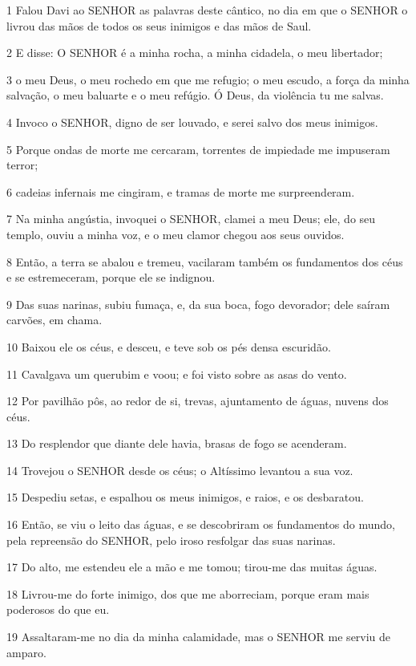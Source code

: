 \par 1 Falou Davi ao SENHOR as palavras deste cântico, no dia em que o SENHOR o livrou das mãos de todos os seus inimigos e das mãos de Saul.
\par 2 E disse: O SENHOR é a minha rocha, a minha cidadela, o meu libertador;
\par 3 o meu Deus, o meu rochedo em que me refugio; o meu escudo, a força da minha salvação, o meu baluarte e o meu refúgio. Ó Deus, da violência tu me salvas.
\par 4 Invoco o SENHOR, digno de ser louvado, e serei salvo dos meus inimigos.
\par 5 Porque ondas de morte me cercaram, torrentes de impiedade me impuseram terror;
\par 6 cadeias infernais me cingiram, e tramas de morte me surpreenderam.
\par 7 Na minha angústia, invoquei o SENHOR, clamei a meu Deus; ele, do seu templo, ouviu a minha voz, e o meu clamor chegou aos seus ouvidos.
\par 8 Então, a terra se abalou e tremeu, vacilaram também os fundamentos dos céus e se estremeceram, porque ele se indignou.
\par 9 Das suas narinas, subiu fumaça, e, da sua boca, fogo devorador; dele saíram carvões, em chama.
\par 10 Baixou ele os céus, e desceu, e teve sob os pés densa escuridão.
\par 11 Cavalgava um querubim e voou; e foi visto sobre as asas do vento.
\par 12 Por pavilhão pôs, ao redor de si, trevas, ajuntamento de águas, nuvens dos céus.
\par 13 Do resplendor que diante dele havia, brasas de fogo se acenderam.
\par 14 Trovejou o SENHOR desde os céus; o Altíssimo levantou a sua voz.
\par 15 Despediu setas, e espalhou os meus inimigos, e raios, e os desbaratou.
\par 16 Então, se viu o leito das águas, e se descobriram os fundamentos do mundo, pela repreensão do SENHOR, pelo iroso resfolgar das suas narinas.
\par 17 Do alto, me estendeu ele a mão e me tomou; tirou-me das muitas águas.
\par 18 Livrou-me do forte inimigo, dos que me aborreciam, porque eram mais poderosos do que eu.
\par 19 Assaltaram-me no dia da minha calamidade, mas o SENHOR me serviu de amparo.
